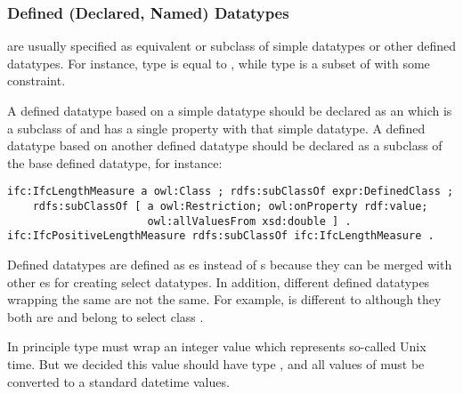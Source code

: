 
\subsubsection{Defined (Declared, Named) Datatypes} are usually specified as equivalent or subclass of simple data\-types or other defined data\-types. For instance, type  is equal to , while type  is a subset of  with some constraint.

\begin{principle}%
A defined data\-type based on a simple data\-type should be declared as an  which is a subclass of  and has a single property  with that simple data\-type. A defined data\-type based on another defined data\-type should be declared as a subclass of the base defined data\-type, for instance:

\begin{lstlisting}
ifc:IfcLengthMeasure a owl:Class ; rdfs:subClassOf expr:DefinedClass ;
    rdfs:subClassOf [ a owl:Restriction; owl:onProperty rdf:value;
                      owl:allValuesFrom xsd:double ] .
ifc:IfcPositiveLengthMeasure rdfs:subClassOf ifc:IfcLengthMeasure .
\end{lstlisting}
\end{principle}


Defined data\-types are defined as es instead of s because they can be merged with other es for creating select data\-types. In addition, different defined data\-types wrapping the same  are not the same. For example,  is different to  although they both are  and belong to select class .

In principle type  must wrap an integer value which represents so-called Unix time. But we decided this value should have type , and all values of  must be converted to a standard datetime values.



